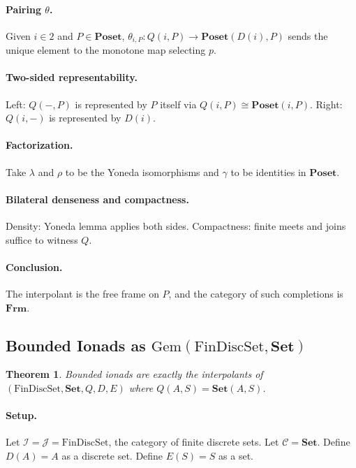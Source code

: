\documentclass[11pt]{article}
\theoremstyle{plain}
\newtheorem{theorem}{Theorem}[section]
\theoremstyle{definition}
\theoremstyle{remark}
\begin{document}
\paragraph{Pairing $\theta$.}
Given $i\in 2$ and $P\in \mathbf{Poset}$, $\theta_{i,P}: Q(i,P) \to \mathbf{Poset}(D(i),P)$ sends the unique element to the monotone map selecting $p$.

\paragraph{Two-sided representability.}
Left: $Q(-,P)$ is represented by $P$ itself via $Q(i,P) \cong \mathbf{Poset}(i,P)$.  
Right: $Q(i,-)$ is represented by $D(i)$.

\paragraph{Factorization.}
Take $\lambda$ and $\rho$ to be the Yoneda isomorphisms and $\gamma$ to be identities in $\mathbf{Poset}$.

\paragraph{Bilateral denseness and compactness.}
Density: Yoneda lemma applies both sides.  
Compactness: finite meets and joins suffice to witness $Q$.

\paragraph{Conclusion.}
The interpolant is the free frame on $P$, and the category of such completions is $\mathbf{Frm}$.

\subsection{Bounded Ionads as $\mathrm{Gem}(\mathrm{FinDiscSet},\mathbf{Set})$}
\begin{theorem}
Bounded ionads are exactly the interpolants of $(\mathrm{FinDiscSet},\mathbf{Set},Q,D,E)$ where $Q(A,S) = \mathbf{Set}(A,S)$.
\end{theorem}

\paragraph{Setup.}
Let $\mathcal{I}=\mathcal{J}=\mathrm{FinDiscSet}$, the category of finite discrete sets. Let $\mathcal{C}=\mathbf{Set}$.  
Define $D(A)=A$ as a discrete set. Define $E(S)=S$ as a set.
\end{document}
